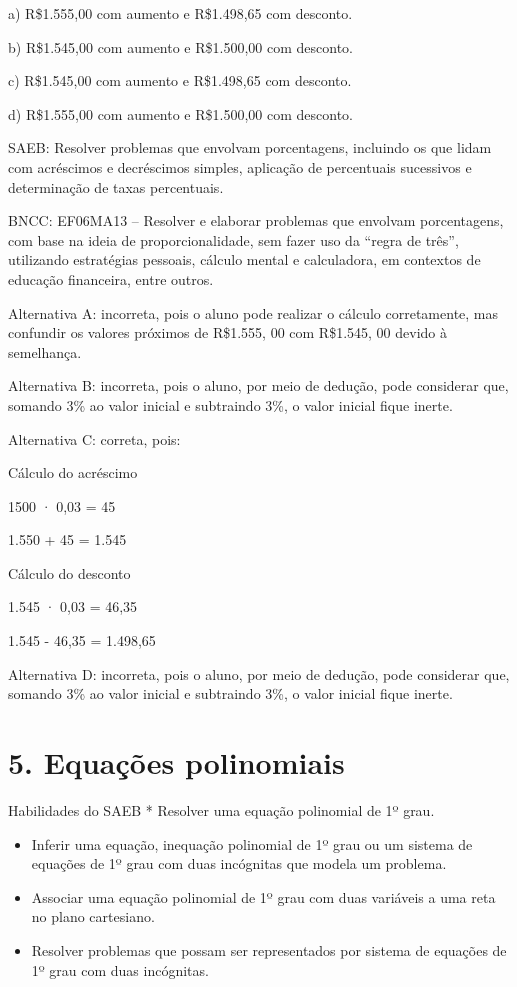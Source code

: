 a) R\$1.555,00 com aumento e R\$1.498,65 com desconto.

b) R\$1.545,00 com aumento e R\$1.500,00 com desconto.

c) R\$1.545,00 com aumento e R\$1.498,65 com desconto.

d) R\$1.555,00 com aumento e R\$1.500,00 com desconto.

SAEB: Resolver problemas que envolvam porcentagens, incluindo os que
lidam com acréscimos e decréscimos simples, aplicação de percentuais
sucessivos e determinação de taxas percentuais.

BNCC: EF06MA13 -- Resolver e elaborar problemas que envolvam
porcentagens, com base na ideia de proporcionalidade, sem fazer uso da
``regra de três'', utilizando estratégias pessoais, cálculo mental e
calculadora, em contextos de educação financeira, entre outros.

Alternativa A: incorreta, pois o aluno pode realizar o cálculo
corretamente, mas confundir os valores próximos de R\$1.555, 00 com
R\$1.545, 00 devido à semelhança.

Alternativa B: incorreta, pois o aluno, por meio de dedução, pode
considerar que, somando 3\% ao valor inicial e subtraindo 3\%, o valor
inicial fique inerte.

Alternativa C: correta, pois:

Cálculo do acréscimo

1500 · 0,03 = 45

1.550 + 45 = 1.545

Cálculo do desconto

1.545 · 0,03 = 46,35

1.545 - 46,35 = 1.498,65

Alternativa D: incorreta, pois o aluno, por meio de dedução, pode
considerar que, somando 3\% ao valor inicial e subtraindo 3\%, o valor
inicial fique inerte.

\chapter{5. Equações polinomiais}

Habilidades do SAEB * Resolver uma equação polinomial de 1º grau.

\begin{itemize}
\item
  Inferir uma equação, inequação polinomial de 1º grau ou um sistema de
  equações de 1º grau com duas incógnitas que modela um problema.
\item
  Associar uma equação polinomial de 1º grau com duas variáveis a uma
  reta no plano cartesiano.
\item
  Resolver problemas que possam ser representados por sistema de
  equações de 1º grau com duas incógnitas.
\end{itemize}

